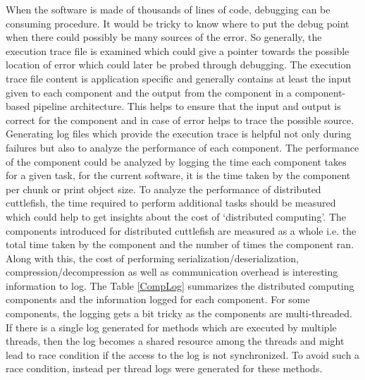When the software is made of thousands of lines of code, debugging can be consuming procedure. It would be tricky to know where to put the debug point when there  could possibly be many sources of the error. So generally, the execution trace file is examined which could give a pointer towards the possible location of error which could later be probed through debugging. The execution trace file content is application specific and generally contains at least the input given to each component and the output from the component in a component-based pipeline architecture. This helps to ensure that the input and output is correct for the component and in case of error helps to trace the possible source. \newline    
Generating log files which provide the execution trace is helpful not only during failures but also to analyze the performance of each component. The performance of the component could be analyzed by logging the time each component takes for a given task, for the current software, it is the time taken by the component per chunk or print object size. To analyze the performance of distributed cuttlefish, the time required to perform additional tasks should be measured which could help to get insights about the cost of {\lq}distributed computing{\rq}. The components introduced for distributed cuttlefish are measured as a whole i.e. the total time taken by the component and the number of times the component ran. Along with this, the cost of performing serialization/deserialization, compression/decompression as well as communication overhead is interesting information to log. The Table \ref{CompLog} summarizes the distributed computing components and the information logged for each component. For some components, the logging gets a bit tricky as the components are multi-threaded. If there is a single log generated for methods which are executed by multiple threads, then the log becomes a shared resource among the threads and might lead to race condition if the access to the log is not synchronized. To avoid such a race condition, instead per thread logs were generated for these methods.  


